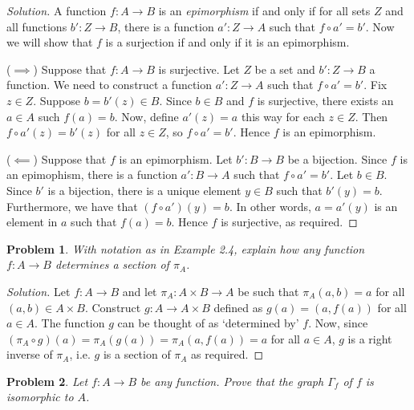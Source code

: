 \documentclass[fontsize=14pt]{scrartcl}
\newtheorem{problem-internal}{Problem}[subsection]
\newenvironment{problem}{
  \medskip
  \begin{problem-internal}
}{
  \end{problem-internal}
}
\newenvironment{solution}{
  \begin{proof}[Solution]
  \vspace{-8px}
  \setlength{\parskip}{4px}
  \setlength{\parindent}{0px}
}{
  \end{proof}
}
\begin{document}
\begin{solution}
A function $f:A\to B$ is an \textit{epimorphism} if and only if for all sets $Z$
and all functions $b':Z\to B$, there is a function $a':Z\to A$ such that $f\circ
a' = b'$. Now we will show that $f$ is a surjection if and only if it is an
epimorphism.

($\implies$) Suppose that $f:A\to B$ is surjective. Let $Z$ be a set and
$b':Z\to B$ a function. We need to construct a function $a':Z\to A$ such that
$f\circ a' = b'$. Fix $z\in Z$. Suppose $b=b'(z)\in B$. Since $b\in B$ and $f$
is surjective, there exists an $a\in A$ such $f(a) = b$. Now, define $a'(z) =
a$ this way for each $z\in Z$. Then $f\circ a'(z) = b'(z)$ for all $z\in Z$, so
$f\circ a' = b'$. Hence $f$ is an epimorphism.

($\impliedby$) Suppose that $f$ is an epimorphism. Let $b':B\to B$ be a
bijection. Since $f$ is an epimophism, there is a function $a':B\to A$ such that
$f\circ a' = b'$. Let $b\in B$. Since $b'$ is a bijection, there is a unique
element $y\in B$ such that $b'(y) = b$. Furthermore, we have that $(f\circ
a')(y) = b$. In other words, $a = a'(y)$ is an element in $a$ such that $f(a) =
b$. Hence $f$ is surjective, as required.
\end{solution}


\begin{problem}
With notation as in Example 2.4, explain how any function $f:A\to B$ determines
a section of $\pi_A$.
\end{problem}

\begin{solution}
Let $f:A\to B$ and let $\pi_A:A\times B\to A$ be such that $\pi_A(a,b) = a$ for
all $(a,b)\in A\times B$. Construct $g:A\to A\times B$ defined as $g(a) = (a,
f(a))$ for all $a\in A$. The function $g$ can be thought of as `determined by'
$f$. Now, since $(\pi_A\circ g)(a) = \pi_A(g(a)) = \pi_A(a, f(a)) = a$ for all
$a\in A$, $g$ is a right inverse of $\pi_A$, i.e. $g$ is a section of $\pi_A$ as
required.
\end{solution}


\begin{problem}
Let $f:A\to B$ be any function. Prove that the graph $\Gamma_f$ of $f$ is
isomorphic to $A$.
\end{problem}
\end{document}
